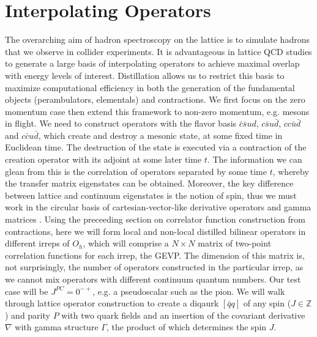 
\chapter{Interpolating Operators}\label{sec:ops}

The overarching aim of hadron spectroscopy on the lattice is to simulate hadrons that we observe in collider experiments. It is advantageous in lattice QCD studies to generate a large basis of interpolating operators to achieve maximal overlap with energy levels of interest. Distillation allows us to restrict this basis to maximize computational efficiency in both the generation of the fundamental objects (perambulators, elementals) and contractions. We first focus on the zero momentum case then extend this framework to non-zero momentum, e.g. mesons in flight. We need to construct operators with the flavor basis $\bar c\bar s ud$, $c\bar s u\bar d$, $cc\bar u\bar d$ and $c\bar c u\bar d$, which create and destroy a mesonic state, at some fixed time in Euclidean time. The destruction of the state is executed via a contraction of the creation operator with its adjoint at some later time $t$.  The information we can glean from this is the correlation of operators separated by some time $t$, whereby the transfer matrix eigenstates can be obtained. Moreover, the key difference between lattice and continuum eigenstates is the notion of spin, thus we must work in the circular basis of cartesian-vector-like derivative operators and gamma matrices \cite{Morningstar:2013bda}. Using the preceeding section on correlator function construction from contractions, here we will form local and non-local distilled bilinear operators in different irreps of $O_h$, which will comprise a $N \times N$ matrix of two-point correlation functions for each irrep, the GEVP. The dimension of this matrix is, not surprisingly, the number of operators constructed in the particular irrep, as we cannot mix operators with different continuum quantum numbers. Our test case will be $J^{PC} =0^{-+}$, e.g. a pseudoscalar such as the pion. We will walk through lattice operator construction to create a diqaurk $[\bar{q}q]$ of any spin ($J \in \mathbb{Z}$) and parity $P$ with two quark fields and an insertion of the covariant derivative $\nabla$ with gamma structure $\Gamma$, the product of which determines the spin $J$.  
  

